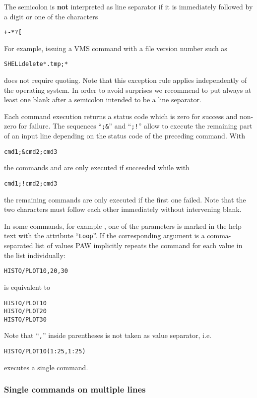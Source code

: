 The semicolon is \textbf{not} interpreted as line
separator if it is immediately followed by a digit or one of the
characters
\begin{alltt}
  +  - *  ?  [
\end{alltt}
For example, issuing a VMS command with a file version number such as
\begin{alltt}
SHELL delete *.tmp;*
\end{alltt}
does not require quoting.
Note that this exception rule applies independently of the operating
system.
In order to avoid surprises we recommend to put always at least one
blank after a semicolon intended to be a line separator.

Each command execution returns a status code which is zero for success
and non-zero for failure.
The sequences ``\texttt{;\&}'' and ``\texttt{;!}'' allow to execute
the remaining part of an input line depending on the status code of
the preceding command.
With
\begin{alltt}
cmd1 ;& cmd2 ; cmd3
\end{alltt}
the commands  and  are only executed if
 succeeded while with
\begin{alltt}
cmd1 ;! cmd2 ; cmd3
\end{alltt}
the remaining commands are only executed if the first one failed.
Note that the two characters must follow each other immediately
without intervening blank.

In some commands, for example , one of the parameters
is marked in the help text with the attribute ``\texttt{Loop}''.
If the corresponding argument is a comma-separated list of values
PAW implicitly repeats the command for each value in the list
individually: 
\begin{alltt}
HISTO/PLOT 10,20,30
\end{alltt}
is equivalent to
\begin{alltt}
HISTO/PLOT 10
HISTO/PLOT 20
HISTO/PLOT 30
\end{alltt}
Note that ``\texttt{,}'' inside parentheses is not taken as value
separator, i.e.\
\begin{alltt}
HISTO/PLOT 10(1:25,1:25)
\end{alltt}
executes a single command.


\subsubsection{Single commands on multiple lines}


